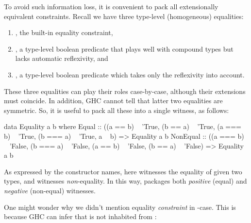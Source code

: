 \documentclass[demotion-paper.tex]{subfiles}
\begin{document}
To avoid such information loss, it is convenient to pack all extensionally equivalent constraints.
Recall we have three type-level (homogeneous) equalities:
\begin{enumerate}
\item {}, the built-in equality constraint,
\item {}, a type-level boolean predicate that plays well with compound types but lacks automatic reflexivity, and
\item {}, a type-level boolean predicate which takes only the reflexivity into account.
\end{enumerate}
These three equalities can play their roles case-by-case, although their extensions must coincide.
In addition, GHC cannot tell that latter two equalities are symmetric.
So, it is useful to pack all these into a single witness, as follows:
\begin{code}
data Equality a b where
  Equal :: ((a == b) ~ 'True, (b == a) ~ 'True,
    (a === b) ~ 'True, (b === a) ~ 'True, a ~ b)
    => Equality a b
  NonEqual
    :: ((a === b) ~ 'False, (b === a) ~ 'False, 
        (a == b) ~ 'False, (b == a) ~ 'False)
    => Equality a b
\end{code}
As expressed by the constructor names, here  witnesses the equality of given two types, and  witnesses \emph{non}-equality.
In this way,  packages both \emph{positive} (equal) and \emph{negative} (non-equal) witnesses.

One might wonder why we didn't mention equality \emph{constraint}  in -case.
This is because GHC can infer that  is not inhabited from :
\end{document}

